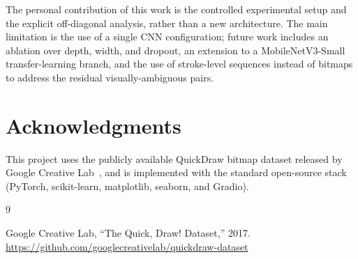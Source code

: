 \documentclass[10pt,twocolumn,a4paper]{article}
\begin{document}
The personal contribution of this work is the controlled experimental setup
and the explicit off-diagonal analysis, rather than a new architecture. The
main limitation is the use of a single CNN configuration; future work
includes an ablation over depth, width, and dropout, an extension to a
MobileNetV3-Small transfer-learning branch, and the use of stroke-level
sequences instead of bitmaps to address the residual visually-ambiguous
pairs.

\section*{Acknowledgments}

This project uses the publicly available QuickDraw bitmap dataset released by
Google Creative Lab~\cite{quickdraw}, and is implemented with the standard
open-source stack (PyTorch, scikit-learn, matplotlib, seaborn, and Gradio).

\begin{thebibliography}{9}

	Google Creative Lab,
	``The Quick, Draw! Dataset,'' 2017.
	\url{https://github.com/googlecreativelab/quickdraw-dataset}

\end{thebibliography}
\end{document}
